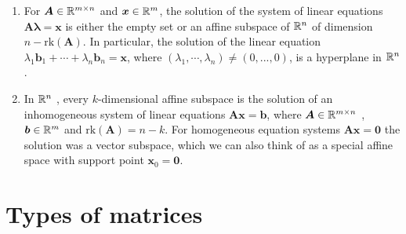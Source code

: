 \begin{enumerate}
    \item For $\bm{A} \in \mathbb{R}^{m\times n}$ and $\bm{x} \in \mathbb{R}^m$, the solution of the system of linear equations $\bm{A} \bm{\lambda}  = \bm{x}$ is either the empty set or an affine subspace of $\mathbb{R}^n$ of dimension $n - \text{rk}(\bm{A})$. 
    In particular, the solution of the linear equation $\lambda _1 \bm{b}_1 + \cdots + \lambda _n \bm{b}_n = \bm{x}$, where $(\lambda _1, \cdots , \lambda _n) \neq (0, . . . , 0)$, is a hyperplane in $\mathbb{R}^n$ .
    \hfill \cite{mfml/book/mml/Deisenroth-Faisal-Ong}

    \item In $\mathbb{R}^n$ , every $k$-dimensional affine subspace is the solution of an inhomogeneous system of linear equations $\bm{Ax} = \bm{b}$, where $\bm{A} \in \mathbb{R}^{m\times n}$ , $\bm{b} \in \mathbb{R}^m$ and $\text{rk}(\bm{A}) = n - k$. 
    For homogeneous equation systems $\bm{Ax} = \bm{0}$ the solution was a vector subspace, which we can also think of as a special affine space with support point $\bm{x}_0 = \bm{0}$.
    \hfill \cite{mfml/book/mml/Deisenroth-Faisal-Ong}
\end{enumerate}

























\section{Types of matrices}
















